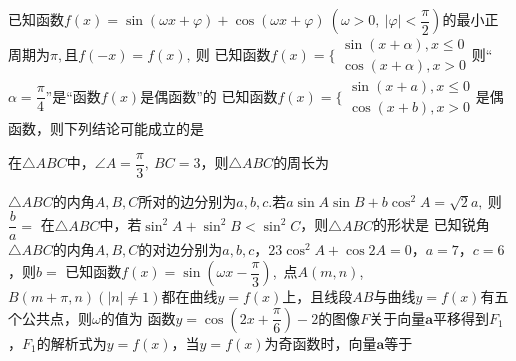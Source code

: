 \begin{questions}
\qs 已知函数$f(x)=\sin (\omega x +\varphi)+\cos (\omega x+\varphi)\ \left(\omega>0,\ \left|\varphi\right|<\dfrac{\pi}{2}\right)$的最小正周期为$ \pi , $且$ f(-x)=f(x),\  $则\xx
{}
\qs 已知函数$f(x)=\Bigg\{\begin{aligned}
\sin(x+\alpha),x\le 0\\\cos (x+\alpha),x>0
\end{aligned}$则“$ \alpha=\dfrac{\pi}{4} $”是“函数$f(x)$是偶函数”的\xx
{}
\qs 已知函数$f(x)=\Bigg\{\begin{aligned}
\sin(x+a),x\le 0\\\cos (x+b),x>0
\end{aligned}$是偶函数，则下列结论可能成立的是\xx




\qs 在$\triangle ABC$中，$ \angle A=\dfrac{\pi}{3},\ BC=3 $，则$ \triangle ABC $的周长为\xx
{}

\qs $\triangle ABC$的内角$ A,B,C $所对的边分别为$ a,b,c $.若$ a\sin A\sin B+b\cos^2A=\sqrt{2}a,\  $则$ \dfrac{b}{a}=$\xx
{}
\qs 在$ \triangle ABC $中，若$ \sin ^2A+\sin^2 B<\sin ^2C $，则$ \triangle ABC $的形状是\xx
{}
\qs 已知锐角$\triangle ABC$的内角$A,B,C$的对边分别为$a,b,c$，$23\cos^2A+\cos 2A=0$，$a=7$，$c=6$，则$b=$\xx
{}
\qs 已知函数$f(x)=\sin \left(\omega x-\dfrac{\pi}{3}\right)$,\ 点$ A(m,n) $,\ $ B(m+\pi,n) (\left|n\right|\ne 1)$都在曲线$ y=f(x) $上，且线段$ AB $与曲线$ y=f(x) $有五个公共点，则$ \omega $的值为\xx
{}
\qs 函数$y=\cos\left(2x+\dfrac{\pi}{6}\right)-2$的图像$ F $关于向量$ \bm{a}$平移得到$ F_1 $，$ F_1 $的解析式为$ y=f(x) $，当$y=f(x)$为奇函数时，向量$\bm{a}$等于\xx
{} 


\end{questions}
